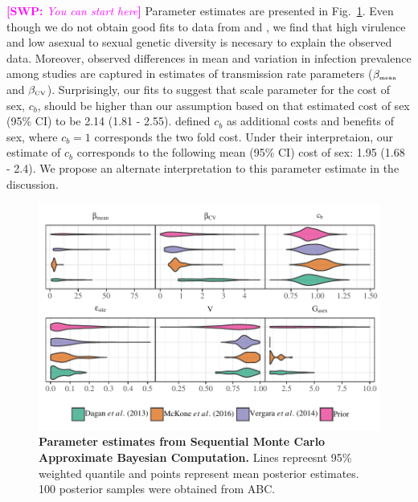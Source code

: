 \documentclass{article}\usepackage[]{graphicx}\usepackage[]{color}
\newcommand{\comment}[3]{\textcolor{#1}{\textbf{[#2: }\textit{#3}\textbf{]}}}
\newcommand{\swp}[1]{\comment{magenta}{SWP}{#1}}
\newcommand{\fref}[1]{Fig.~\ref{fig:#1}}
\begin{document}
\swp{You can start here}
Parameter estimates are presented in \fref{smcparam}.
Even though we do not obtain good fits to data from \cite{dagan2013clonal} and \cite{mckone2016fine}, we find that high virulence and low asexual to sexual genetic diversity is necesary to explain the observed data.
Moreover, observed differences in mean and variation in infection prevalence among studies are captured in estimates of transmission rate parameters ($\beta_{\textrm{\tiny mean}}$ and $\beta_{\textrm{\tiny CV}}$).
Surprisingly, our fits to \cite{mckone2016fit} suggest that scale parameter for the cost of sex, $c_b$, should be higher than our assumption based on \cite{gibson2017two} that estimated cost of sex (95\% CI) to be 2.14 (1.81 - 2.55).
\cite{ashby2015diversity} defined $c_b$ as additional costs and benefits of sex, where $c_b=1$ corresponds the two fold cost.
Under their interpretaion, our estimate of $c_b$ corresponds to the following mean (95\% CI) cost of sex: 1.95 (1.68 - 2.4).
We propose an alternate interpretation to this parameter estimate in the discussion.

\begin{figure}[!ht]
\includegraphics[width=\textwidth]{../fig/posterior.pdf}
\caption{{\bf Parameter estimates from Sequential Monte Carlo Approximate Bayesian Computation.}
Lines repreesnt 95\% weighted quantile and points represent mean posterior estimates. 100 posterior samples were obtained from ABC.
}
\label{fig:smcparam}
\end{figure}
\end{document}
